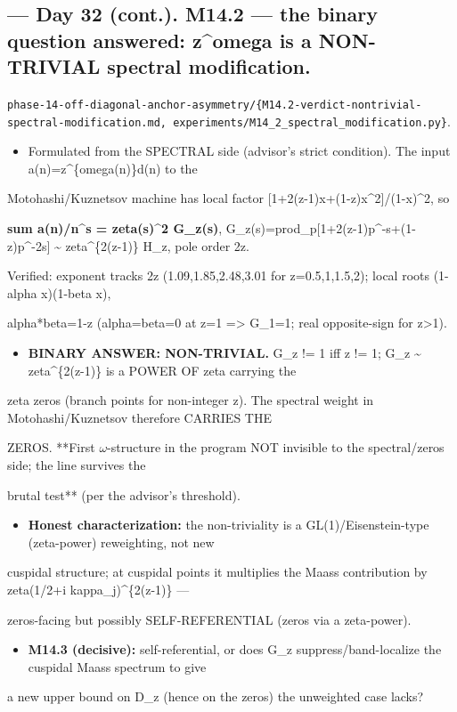 \documentclass[10pt]{article}
\begin{document}
\subsection*{ --- Day 32 (cont.). M14.2 --- the binary question answered: z\textasciicircum{}omega is a NON-TRIVIAL spectral modification.}
\texttt{phase-14-off-diagonal-anchor-asymmetry/\{M14.2-verdict-nontrivial-spectral-modification.md, experiments/M14\_2\_spectral\_modification.py\}}.\par
\begin{itemize}
\item Formulated from the SPECTRAL side (advisor's strict condition). The input a(n)=z\textasciicircum{}\{omega(n)\}d(n) to the
\end{itemize}
  Motohashi/Kuznetsov machine has local factor [1+2(z-1)x+(1-z)x\textasciicircum{}2]/(1-x)\textasciicircum{}2, so\par
  \textbf{sum a(n)/n\textasciicircum{}s = zeta(s)\textasciicircum{}2 G\_z(s)}, G\_z(s)=prod\_p[1+2(z-1)p\textasciicircum{}-s+(1-z)p\textasciicircum{}-2s] \textasciitilde{} zeta\textasciicircum{}\{2(z-1)\} H\_z, pole order 2z.\par
  Verified: exponent tracks 2z (1.09,1.85,2.48,3.01 for z=0.5,1,1.5,2); local roots (1-alpha x)(1-beta x),\par
  alpha*beta=1-z (alpha=beta=0 at z=1 => G\_1=1; real opposite-sign for z>1).\par
\begin{itemize}
\item \textbf{BINARY ANSWER: NON-TRIVIAL.} G\_z != 1 iff z != 1; G\_z \textasciitilde{} zeta\textasciicircum{}\{2(z-1)\} is a POWER OF zeta carrying the
\end{itemize}
  zeta zeros (branch points for non-integer z). The spectral weight in Motohashi/Kuznetsov therefore CARRIES THE\par
  ZEROS. **First \ensuremath{\omega}-structure in the program NOT invisible to the spectral/zeros side; the line survives the\par
  brutal test** (per the advisor's threshold).\par
\begin{itemize}
\item \textbf{Honest characterization:} the non-triviality is a GL(1)/Eisenstein-type (zeta-power) reweighting, not new
\end{itemize}
  cuspidal structure; at cuspidal points it multiplies the Maass contribution by zeta(1/2+i kappa\_j)\textasciicircum{}\{2(z-1)\} ---\par
  zeros-facing but possibly SELF-REFERENTIAL (zeros via a zeta-power).\par
\begin{itemize}
\item \textbf{M14.3 (decisive):} self-referential, or does G\_z suppress/band-localize the cuspidal Maass spectrum to give
\end{itemize}
  a new upper bound on D\_z (hence on the zeros) the unweighted case lacks?\par
\end{document}
